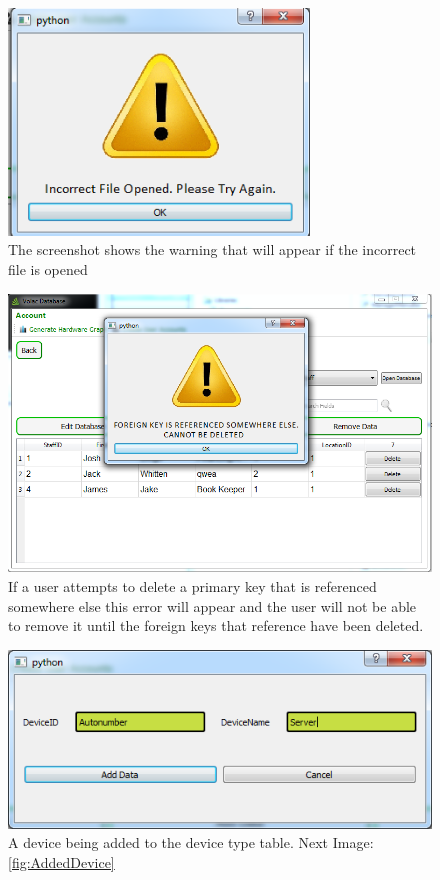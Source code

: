 \begin{figure}[H]
    \includegraphics[width=80mm,scale=0.5]{./Testing/Images/IncorrectFileError.png}
    \caption{The screenshot shows the warning that will appear if the incorrect file is opened} \label{fig:IncorrectFileError}
\end{figure}

\begin{figure}[H]
    \includegraphics[width=\textwidth]{./Testing/Images/DialogNoClickAway.png}
    \caption{If a user attempts to delete a primary key that is referenced somewhere else this error will appear and the user will not be able to remove it until the foreign keys that reference have been deleted.} \label{fig:DialogNoClickAway}
\end{figure}

\begin{figure}[H]
    \includegraphics[width=\textwidth]{./Testing/Images/Dev.png}
    \caption{A device being added to the device type table. Next Image: \ref{fig:AddedDevice}} \label{fig:Dev}
\end{figure}

